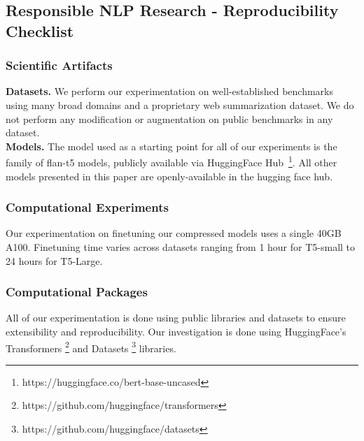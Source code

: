 \subsection{Responsible NLP Research - Reproducibility Checklist}
\subsubsection{Scientific Artifacts}
\noindent\textbf{Datasets.} We perform our experimentation on well-established benchmarks using many broad domains and a proprietary web summarization dataset. We do not perform any modification or augmentation on public benchmarks in any dataset.  \\
\noindent\textbf{Models.} The model used as a starting point for all of our experiments is the family of flan-t5 models, publicly available via HuggingFace Hub~\footnote{https://huggingface.co/bert-base-uncased}. All other models presented in this paper are openly-available in the hugging face hub. 
\subsubsection{Computational Experiments}
Our experimentation on finetuning our compressed models uses a single 40GB A100. Finetuning time varies across datasets ranging from 1 hour for T5-small to 24 hours for T5-Large.  
\subsubsection{Computational Packages}
All of our experimentation is done using public libraries and datasets to ensure extensibility and reproducibility. Our investigation is done using HuggingFace's Transformers \footnote{https://github.com/huggingface/transformers} and Datasets \footnote{https://github.com/huggingface/datasets} libraries.